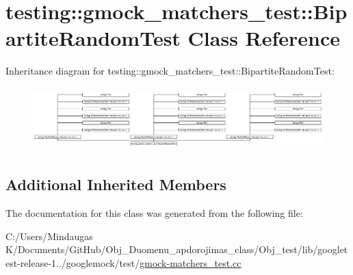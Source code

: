 \hypertarget{classtesting_1_1gmock__matchers__test_1_1_bipartite_random_test}{}\section{testing\+::gmock\+\_\+matchers\+\_\+test\+::Bipartite\+Random\+Test Class Reference}
\label{classtesting_1_1gmock__matchers__test_1_1_bipartite_random_test}
Inheritance diagram for testing\+::gmock\+\_\+matchers\+\_\+test\+::Bipartite\+Random\+Test\+:\begin{figure}[H]
\begin{center}
\leavevmode
\includegraphics[height=2.472406cm]{d8/d88/classtesting_1_1gmock__matchers__test_1_1_bipartite_random_test}
\end{center}
\end{figure}
\subsection*{Additional Inherited Members}


The documentation for this class was generated from the following file\+:\begin{DoxyCompactItemize}
\item 
C\+:/\+Users/\+Mindaugas K/\+Documents/\+Git\+Hub/\+Obj\+\_\+\+Duomenu\+\_\+apdorojimas\+\_\+class/\+Obj\+\_\+test/lib/googletest-\/release-\/1../googlemock/test/\mbox{\hyperlink{_obj__test_2lib_2googletest-release-1_88_81_2googlemock_2test_2gmock-matchers__test_8cc}{gmock-\/matchers\+\_\+test.\+cc}}\end{DoxyCompactItemize}
